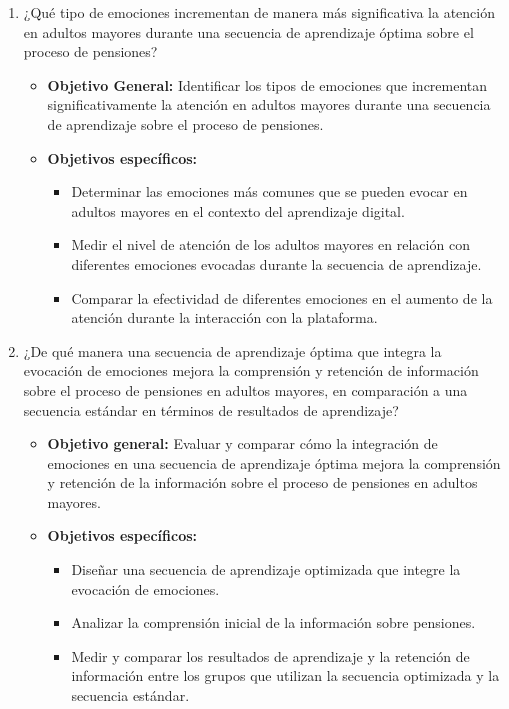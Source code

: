 \begin{enumerate}
    \item ¿Qué tipo de emociones incrementan de manera más significativa la atención en adultos mayores durante una secuencia de aprendizaje óptima sobre el proceso de pensiones?
    \begin{itemize}
        \item \textbf{Objetivo General:} Identificar los tipos de emociones que incrementan significativamente la atención en adultos mayores durante una secuencia de aprendizaje sobre el proceso de pensiones.
        \item \textbf{Objetivos específicos:}
        \begin{itemize}
            \item Determinar las emociones más comunes que se pueden evocar en adultos mayores en el contexto del aprendizaje digital.
            \item Medir el nivel de atención de los adultos mayores en relación con diferentes emociones evocadas durante la secuencia de aprendizaje.
            \item Comparar la efectividad de diferentes emociones en el aumento de la atención durante la interacción con la plataforma.
        \end{itemize}
    \end{itemize}
    \item ¿De qué manera una secuencia de aprendizaje óptima que integra la evocación de emociones mejora la comprensión y retención de información sobre el proceso de pensiones en adultos mayores, en comparación a una secuencia estándar en términos de resultados de aprendizaje?
    \begin{itemize}
        \item \textbf{Objetivo general:} Evaluar y comparar cómo la integración de emociones en una secuencia de aprendizaje óptima mejora la comprensión y retención de la información sobre el proceso de pensiones en adultos mayores.
        \item \textbf{Objetivos específicos:}
        \begin{itemize}
            \item Diseñar una secuencia de aprendizaje optimizada que integre la evocación de emociones.
            \item Analizar la comprensión inicial de la información sobre pensiones.
            \item Medir y comparar los resultados de aprendizaje y la retención de información entre los grupos que utilizan la secuencia optimizada y la secuencia estándar.

\end{itemize}
\end{itemize}
\end{enumerate}
